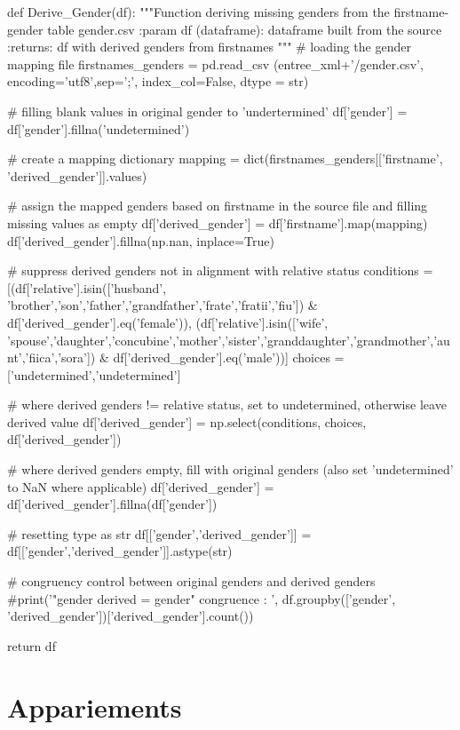 \documentclass[a4paper,12pt,twoside]{book}
\begin{document}
    		    \begin{python}
def Derive_Gender(df):
  """Function deriving missing genders from the firstname-gender table gender.csv
  :param df (dataframe): dataframe built from the source
  :returns: df with derived genders from firstnames
  """
  # loading the gender mapping file
  firstnames_genders = pd.read_csv (entree_xml+'/gender.csv', encoding='utf8',sep=';', index_col=False, dtype = str)
  
  # filling blank values in original gender to 'undertermined'
  df['gender'] = df['gender'].fillna('undetermined')

  # create a mapping dictionary
  mapping = dict(firstnames_genders[['firstname', 'derived_gender']].values)
  
  # assign the mapped genders based on firstname in the source file and filling missing values as empty
  df['derived_gender'] = df['firstname'].map(mapping)
  df['derived_gender'].fillna(np.nan, inplace=True)
  
  # suppress derived genders not in alignment with relative status
  conditions = [(df['relative'].isin(['husband', 'brother','son','father','grandfather','frate','fratii','fiu']) & df['derived_gender'].eq('female')),
                (df['relative'].isin(['wife', 'spouse','daughter','concubine','mother','sister','granddaughter','grandmother','aunt','fiica','sora']) & df['derived_gender'].eq('male'))]
  choices = ['undetermined','undetermined']
  
  # where derived genders != relative status, set to undetermined, otherwise leave derived value
  df['derived_gender'] = np.select(conditions, choices, df['derived_gender'])
  
  # where derived genders empty, fill with original genders (also set 'undetermined' to NaN where applicable)
  df['derived_gender'] = df['derived_gender'].fillna(df['gender'])
    
  # resetting type as str
  df[['gender','derived_gender']] = df[['gender','derived_gender']].astype(str)
  
  # congruency control between original genders and derived genders
  #print('\n "gender derived = gender" congruence : \n', df.groupby(['gender', 'derived_gender'])['derived_gender'].count())

  return df
                \end{python}
    		    
    	        \pagebreak
	    
	    \section{Appariements}
\end{document}
